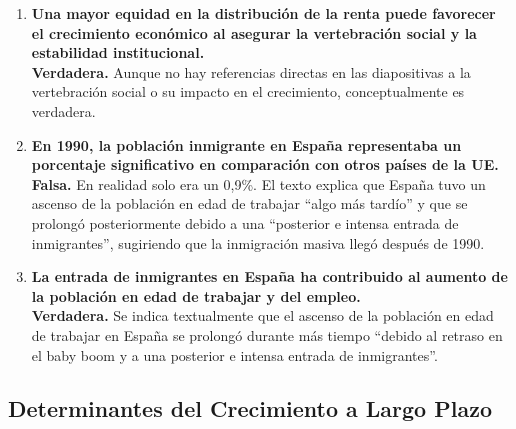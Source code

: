 \begin{enumerate}[label=\arabic*., series=preguntas]
    \item \textbf{Una mayor equidad en la distribución de la renta puede favorecer el crecimiento económico al asegurar la vertebración social y la estabilidad institucional.} \\
    \textbf{Verdadera.} Aunque no hay referencias directas en las diapositivas a la vertebración social o su impacto en el crecimiento, conceptualmente es verdadera.

    \item \textbf{En 1990, la población inmigrante en España representaba un porcentaje significativo en comparación con otros países de la UE.} \\
    \textbf{Falsa.} En realidad solo era un 0,9\%. El texto explica que España tuvo un ascenso de la población en edad de trabajar ``algo más tardío'' y que se prolongó posteriormente debido a una ``posterior e intensa entrada de inmigrantes'', sugiriendo que la inmigración masiva llegó después de 1990.

    \item \textbf{La entrada de inmigrantes en España ha contribuido al aumento de la población en edad de trabajar y del empleo.} \\
    \textbf{Verdadera.} Se indica textualmente que el ascenso de la población en edad de trabajar en España se prolongó durante más tiempo ``debido al retraso en el baby boom y a una posterior e intensa entrada de inmigrantes''.

\end{enumerate}

\subsection*{Determinantes del Crecimiento a Largo Plazo}

